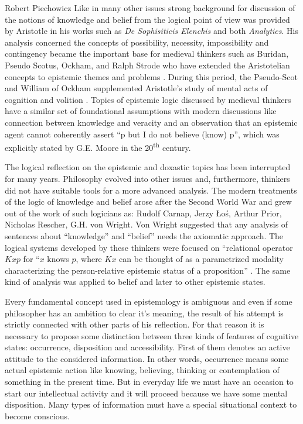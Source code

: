 \begin{artengenv}{Robert Piechowicz}
\indent Like in many other issues strong background for discussion of the notions of knowledge and belief from the logical point of view was provided by Aristotle in his works such as \textit{De Sophisiticis Elenchis} and both \textit{Analytics}. His analysis concerned the concepts of possibility, necessity, impossibility and contingency  became the important base for medieval thinkers such as Buridan, Pseudo Scotus, Ockham, and Ralph Strode who have extended the Aristotelian concepts to epistemic themes and problems \parencites[see][]{boh_epistemic_1993}{knuuttila_modalities_1993}.
During this period, the Pseudo-Scot and William of Ockham supplemented Aristotle’s study of mental acts of cognition and volition
\parencite[see][p.130]{boh_epistemic_1993}.
Topics of epistemic logic discussed by medieval thinkers have a similar set of foundational assumptions with modern discussions like connection between knowledge and veracity and an observation that an epistemic agent cannot coherently assert ``p but I do not believe (know) p'', which was explicitly stated  by G.E. Moore in the 20\textsuperscript{th} century.

The logical reflection on the epistemic and doxastic topics has been interrupted for many years. Philosophy evolved into other issues and, furthermore, thinkers did not have suitable tools for a more advanced analysis. The modern treatments of the logic of knowledge and belief arose after the Second World War and grew out of the work of such logicians as: Rudolf Carnap, Jerzy \L{}o\'{s}, Arthur Prior, Nicholas Rescher, G.H. von Wright. Von Wright suggested that any analysis of sentences about ``knowledge'' and ``belief'' needs the axiomatic approach. The logical systems developed by these thinkers were focused on ``relational operator $Kxp$ for ``$x$ knows $p$, where $Kx$ can be thought of as a parametrized modality characterizing  the person-relative epistemic status of a proposition''
\parencite[][p.478]{jacquette_epistemic_2002}.
The same kind of analysis was applied to belief and later to other epistemic states.

	Every fundamental concept used in epistemology is ambiguous and even if some philosopher has an ambition to clear it’s meaning, the result of his attempt is strictly connected with other parts of his reflection. For that reason it is necessary to propose some distinction between three kinds of features of cognitive states: occurrence, disposition and accessibility. First of them denotes an active attitude to the considered information. In other words, occurrence means some actual epistemic action like knowing, believing, thinking or contemplation of something in the present time. But in everyday life we must have an occasion to start our intellectual activity and it will proceed because we have some mental disposition. Many types of information must have a special situational context to become conscious. 


\end{artengenv}

